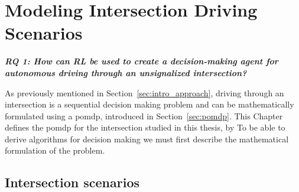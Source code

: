 \chapter{Modeling Intersection Driving Scenarios}
\label{ch:modeling_intersection}

\begin{center}
  \textit{\textbf{RQ 1: How can RL be used to create a decision-making agent for autonomous driving through an unsignalized intersection?}}
  \end{center}
  \vspace{12pt}
  
As previously mentioned in Section~\ref{sec:intro_approach}, driving through an intersection is a sequential decision making problem and can be mathematically formulated using a \gls{pomdp}, introduced in Section~\ref{sec:pomdp}. This Chapter defines the \gls{pomdp} for the intersection studied in this thesis, by 
To be able to derive algorithms for decision making we must first describe the mathematical formulation of the problem.  

\section{Intersection scenarios}

    
    
  
  
